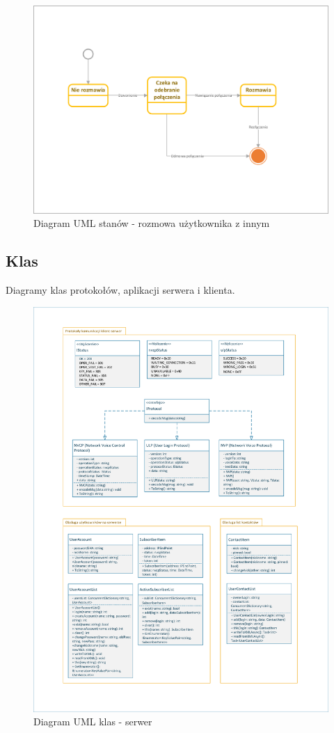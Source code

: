 \documentclass[12pt,a4paper]{article}
\begin{document}
	\begin{figure}[h!]
		\begin{center}
			\includegraphics*[width=.65\textwidth]{UML_stan_rozmowa.pdf}
		\end{center}
		\caption{Diagram UML stanów - rozmowa użytkownika z innym}
	\end{figure}
	
	\pagebreak
	\subsection{Klas}
	\par Diagramy klas protokołów, aplikacji serwera i klienta.
	\begin{figure}[h!]
		\begin{center}
			\includegraphics*[width=.8\textwidth]{UML_klas_server.pdf}
		\end{center}
		\caption{Diagram UML klas - serwer}
	\end{figure}
	
\end{document}
